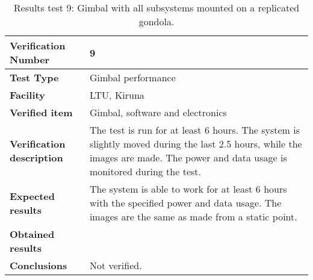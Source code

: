 \begin{table}[H]
\centering

\begin{tabular}{|m{}| m{} |}
\hline
\textbf{Verification Number} 		& 9 				\\ \hline
\textbf{Test Type} 					& Gimbal performance\\ \hline
\textbf{Facility} 					& LTU, Kiruna 		\\ \hline
\textbf{Verified item} 				& Gimbal, software and electronics \\ \hline

\textbf{Verification description} 	& The test is run for at least 6 hours. The system is slightly moved during the last 2.5 hours, while the images are made. The power and data usage is monitored during the test. \\ \hline

\textbf{Expected results} 			& The system is able to work for at least 6 hours with the specified power and data usage. The images are the same as made from a static point. \\ \hline

\textbf{Obtained results} 			& \\ \hline

\textbf{Conclusions} 				& Not verified.		\\ \hline
\end{tabular}
\caption{Results test 9: Gimbal with all subsystems mounted on a replicated gondola.}
\label{tab:testresult9:gimbal}
\end{table}


\raggedbottom
